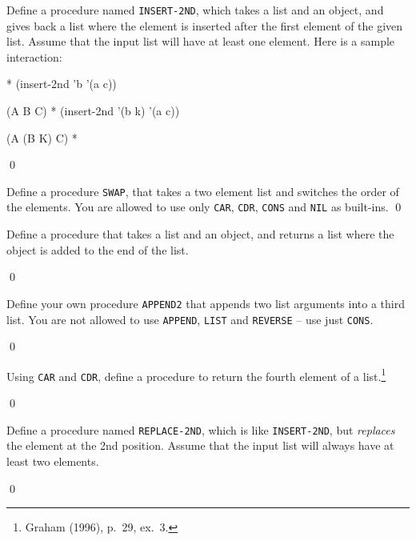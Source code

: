 \documentclass[a4paper,11pt]{article}
\begin{document}
\noindent\hrulefill

\begin{uexercise}
Define a procedure named \Verb+INSERT-2ND+, which takes a list and an object, and gives back a list where the element is inserted after the first element of the given list. Assume that the input list will have at least one element. Here is a sample interaction:

\begin{lispcode}
* (insert-2nd 'b '(a c))

(A B C)
* (insert-2nd '(b k) '(a c))

(A (B K) C)
* 
\end{lispcode}

\qed
\end{uexercise}

\begin{uexercise}

Define a procedure \Verb+SWAP+, that takes a two element list and switches the order of the elements. You are allowed to use only \Verb+CAR+, \Verb+CDR+, \Verb+CONS+ and \Verb+NIL+ as built-ins.
\qed
\end{uexercise}

\begin{uexercise}
Define a procedure that takes a list and an object, and returns a list where the object is added to the end of the list.

\qed
\end{uexercise}

\begin{uexercise}
Define your own procedure \Verb+APPEND2+ that appends two list arguments into a third list. You are not allowed to use \Verb+APPEND+, \Verb+LIST+ and \Verb+REVERSE+ -- use just \Verb+CONS+.

\qed
\end{uexercise}

\begin{uexercise}
Using \Verb+CAR+ and \Verb+CDR+, define a procedure to return the fourth element of a list.\footnote{Graham (1996), p.\ 29, ex.\ 3.} 

\qed
\end{uexercise}

\begin{uexercise}
Define a procedure named \Verb+REPLACE-2ND+, which is like \Verb+INSERT-2ND+, but \emph{replaces} the element at the 2nd position. Assume that the input list will always have at least two elements.

\qed
\end{uexercise}
\end{document}

